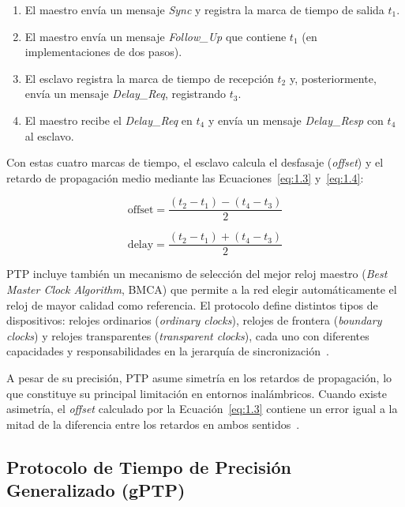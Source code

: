 \begin{enumerate}
\item El maestro envía un mensaje \textit{Sync} y registra la marca de tiempo de salida $t_1$.
\item El maestro envía un mensaje \textit{Follow\_Up} que contiene $t_1$ (en implementaciones de dos pasos).
\item El esclavo registra la marca de tiempo de recepción $t_2$ y, posteriormente, envía un mensaje \textit{Delay\_Req}, registrando $t_3$.
\item El maestro recibe el \textit{Delay\_Req} en $t_4$ y envía un mensaje \textit{Delay\_Resp} con $t_4$ al esclavo.
\end{enumerate}

Con estas cuatro marcas de tiempo, el esclavo calcula el desfasaje (\textit{offset}) y el retardo de propagación medio mediante las Ecuaciones~\ref{eq:1.3} y~\ref{eq:1.4}:

\begin{equation}
\text{offset} = \frac{(t_2 - t_1) - (t_4 - t_3)}{2}
\label{eq:1.3}
\end{equation}

\begin{equation}
\text{delay} = \frac{(t_2 - t_1) + (t_4 - t_3)}{2}
\label{eq:1.4}
\end{equation}

PTP incluye también un mecanismo de selección del mejor reloj maestro (\textit{Best Master Clock Algorithm}, BMCA) que permite a la red elegir automáticamente el reloj de mayor calidad como referencia. El protocolo define distintos tipos de dispositivos: relojes ordinarios (\textit{ordinary clocks}), relojes de frontera (\textit{boundary clocks}) y relojes transparentes (\textit{transparent clocks}), cada uno con diferentes capacidades y responsabilidades en la jerarquía de sincronización~\cite{ieee1588_2019}.

A pesar de su precisión, PTP asume simetría en los retardos de propagación, lo que constituye su principal limitación en entornos inalámbricos. Cuando existe asimetría, el \textit{offset} calculado por la Ecuación~\ref{eq:1.3} contiene un error igual a la mitad de la diferencia entre los retardos en ambos sentidos~\cite{exel2014}.

\subsection{Protocolo de Tiempo de Precisión Generalizado (gPTP)}
\label{sec:1.5.2}

